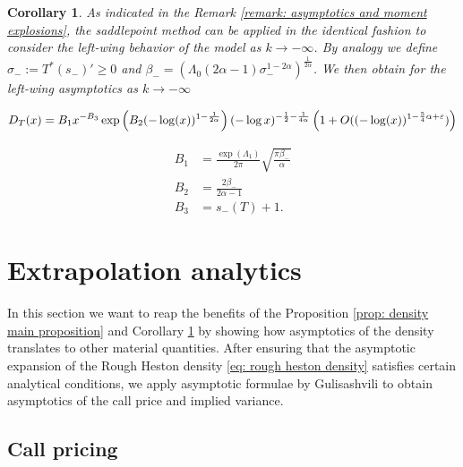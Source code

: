 \documentclass[12pt,twoside]{article}
\theoremstyle{plain}
\theoremstyle{plain}
\newtheorem{corollary}[proposition]{Corollary}
\theoremstyle{definition}
\theoremstyle{remark}
\numberwithin{equation}{section}
\begin{document}
\newpage\clearpage

\begin{corollary}
\label{cor: left wing expansion}
As indicated in the Remark \ref{remark: asymptotics and moment explosions}, the saddlepoint method can be applied in the identical fashion to consider the left-wing behavior of the model as $k\rightarrow -\infty$. By analogy we define $\sigma_- := T^*(s_-)' \geq 0$ and $\beta_- = \left(\Lambda_0(2\alpha -1) \sigma_- ^ {1-2\alpha}\right)^{\frac{1}{2\alpha}}$. We then obtain for the left-wing asymptotics as $k\rightarrow -\infty$

\begin{equation}
\label{eq: rough heston left-wing asymptotic density expansion}
\footnotesize
D_T(x) = B_1 x^{-B_3} \exp\left(B_2 (-\log(x)) ^{1-\frac{1}{2\alpha}} \right) (-\log x) ^ {-\frac 12 -\frac{1}{4\alpha}} \left(1+O((-\log(x))^{1-\frac 54 \alpha + \varepsilon})\right)
\end{equation}

\begin{align}
B_1 &= \frac{\exp \left(\Lambda_{1}\right)}{2 \pi} \sqrt{\frac{\pi \beta_-}{\alpha}} \nonumber \\[10pt]
B_2 &= \frac{2 \beta_-}{2 \alpha-1} \nonumber \\[10pt]
B_3 &= s_-(T) + 1. \nonumber
\end{align}

\end{corollary}

\vspace{10pt}

\section{Extrapolation analytics}
\label{sec: extrapolation analytics}

In this section we want to reap the benefits of the Proposition \ref{prop: density main proposition} and Corollary \ref{cor: left wing expansion} by showing how asymptotics of the density translates to other material quantities. After ensuring that the asymptotic expansion of the Rough Heston density \eqref{eq: rough heston density} satisfies certain analytical conditions, we apply asymptotic formulae by Gulisashvili to obtain asymptotics of the call price and implied variance.

\subsection{Call pricing}
\end{document}
